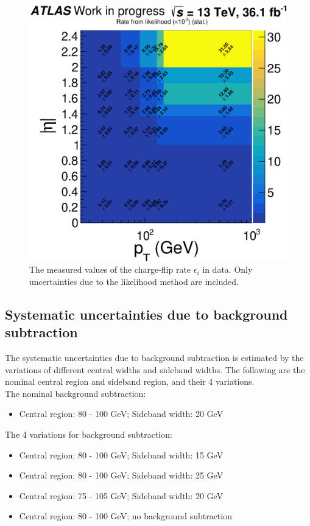 \begin{figure}
\centering
\includegraphics[width=\textwidth]{data/plot/charge_flip/FitPlots/data_cf_rate_stat.eps}
\caption{The measured values of the charge-flip rate $\epsilon_i$ in data. Only uncertainties due to the likelihood method are included.}
\label{fig:charge_flip_data_stat}
\end{figure}

\subsection{Systematic uncertainties due to background subtraction}
\label{sec:sys_background_subtraction}
The systematic uncertainties due to background subtraction is estimated by the variations of different central widths and sideband widths.
The following are the nominal central region and sideband region, and their 4 variations. \\
The nominal background subtraction:
\begin{itemize}
\item Central region: 80 - 100 GeV; Sideband width: 20 GeV
\end{itemize}
The 4 variations for background subtraction:
\begin{itemize}
\item Central region: 80 - 100 GeV; Sideband width: 15 GeV
\item Central region: 80 - 100 GeV; Sideband width: 25 GeV
\item Central region: 75 - 105 GeV; Sideband width: 20 GeV
\item Central region: 80 - 100 GeV; no background subtraction
\end{itemize}

